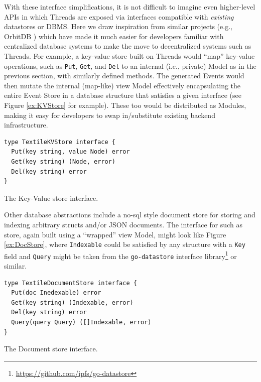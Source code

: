 \documentclass{textile}
\begin{document}
With these interface simplifications, it is not difficult to imagine even higher-level APIs in which Threads are exposed via interfaces compatible with \emph{existing} datastores or DBMS. Here we draw inspiration from similar projects (e.g., OrbitDB \cite{markroberthendersonOrbitDBFieldManual2019}) which have made it much easier for developers familiar with centralized database systems to make the move to decentralized systems such as Threads. For example, a key-value store built on Threads would ``map'' key-value operations, such as \texttt{Put}, \texttt{Get}, and \texttt{Del} to an internal (i.e., private) Model as in the previous section, with similarly defined methods. The generated Events would then mutate the internal (map-like) view Model effectively encapsulating the entire Event Store in a database structure that satisfies a given interface (see Figure \ref{ex:KVStore} for example). These too would be distributed as Modules, making it easy for developers to swap in/substitute existing backend infrastructure.

\begin{example}
  \begin{minipage}{.45\textwidth}
    \begin{lstlisting}
type TextileKVStore interface {
  Put(key string, value Node) error
  Get(key string) (Node, error)
  Del(key string) error
}
    \end{lstlisting}
  \end{minipage}
\caption{The Key-Value store interface.}
 \label{ex:KVStore}
\end{example}

Other database abstractions include a no-sql style document store for storing and indexing arbitrary structs and/or JSON documents. The interface for such as store, again built using a ``wrapped'' view Model, might look like Figure \ref{ex:DocStore}, where \texttt{Indexable} could be satisfied by any structure with a \texttt{Key} field and \texttt{Query} might be taken from the \texttt{go-datastore} interface library\footnote{\url{https://github.com/ipfs/go-datastore}} or similar.

\begin{example}
  \begin{minipage}{.45\textwidth}
    \begin{lstlisting}
type TextileDocumentStore interface {
  Put(doc Inedexable) error
  Get(key string) (Indexable, error)
  Del(key string) error
  Query(query Query) ([]Indexable, error)
}
    \end{lstlisting}
  \end{minipage}
\caption{The Document store interface.}
\label{ex:DocStore}
\end{example} 
\end{document}
